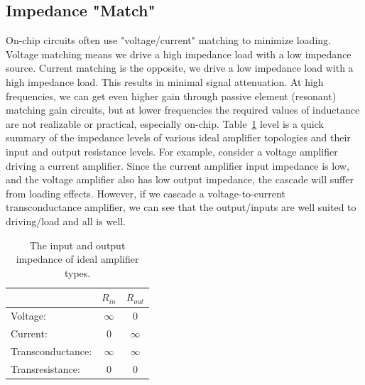 \subsection{Impedance "Match"}
On-chip circuits often use "voltage/current" matching to minimize loading.  Voltage matching means we drive a high impedance load with a low impedance source.  Current matching is the opposite, we drive a low impedance load with a high impedance load.  This results in minimal signal attenuation.  At high frequencies, we can get even higher gain through passive element (resonant) matching gain circuits, but at lower frequencies the required values of inductance are not realizable or practical, especially on-chip.
Table~\ref{tab:imp} level is a quick summary of the impedance levels of various ideal amplifier topologies and their input and output resistance levels.   For example, consider a voltage amplifier driving a current amplifier.  Since the current amplifier input impedance is low, and the voltage amplifier also has low output impedance, the cascade will suffer from loading effects.  However, if we cascade a voltage-to-current transconductance amplifier, we can see that the output/inputs are well suited to driving/load and all is well.
    \begin{table}[tb]
        \begin{center}
        \begin{tabular}{|l|c|c|}
        \hline
          &  $R_{in}$ &  $R_{out}$ \\
        \hline
        Voltage: & $\infty$ &  $0$ \\
        Current: & $0$  &  $\infty$ \\
        Transconductance: & $\infty$ &  $\infty$ \\
        Transresistance: & $0$ &  $0$ \\
        \hline
        \end{tabular}
        \end{center}
        \caption{The input and output impedance of ideal amplifier types.
        \label{tab:imp}} 
    \end{table}
